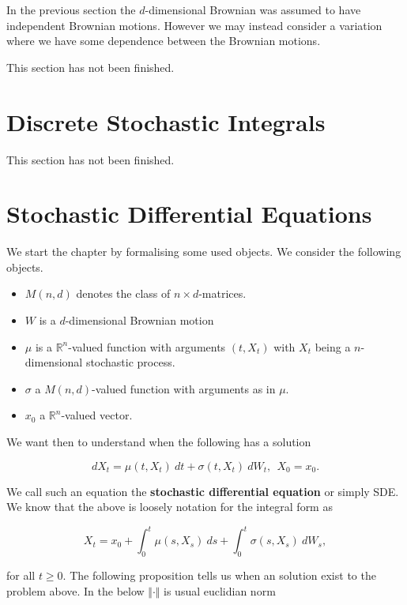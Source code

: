 \documentclass[a4paper,12pt,openany]{book}
\providecommand{\tightlist}{%
 \setlength{\itemsep}{0pt}\setlength{\parskip}{0pt}}
\begin{document}
In the previous section the \(d\)-dimensional Brownian was assumed to have independent Brownian motions. However we may instead consider a variation where we have some dependence between the Brownian motions.

This section has not been finished.

\hypertarget{discrete-stochastic-integrals}{%
\section{Discrete Stochastic Integrals}\label{discrete-stochastic-integrals}}

This section has not been finished.

\hypertarget{stochastic-differential-equations}{%
\section{Stochastic Differential Equations}\label{stochastic-differential-equations}}

We start the chapter by formalising some used objects. We consider the following objects.

\begin{itemize}
\tightlist
\item
  \(M(n,d)\) denotes the class of \(n\times d\)-matrices.
\item
  \(W\) is a \(d\)-dimensional Brownian motion
\item
  \(\mu\) is a \(\mathbb{R}^n\)-valued function with arguments \((t,X_t)\) with \(X_t\) being a \(n\)-dimensional stochastic process.
\item
  \(\sigma\) a \(M(n,d)\)-valued function with arguments as in \(\mu\).
\item
  \(x_0\) a \(\mathbb{R}^n\)-valued vector.
\end{itemize}

We want then to understand when the following has a solution

\[
dX_t=\mu(t,X_t)\ dt + \sigma(t,X_t)\ dW_t,\ \ X_0=x_0.\tag{5.1/2}
\]

We call such an equation the \textbf{stochastic differential equation} or simply SDE. We know that the above is loosely notation for the integral form as

\[
X_t=x_0+\int_0^t\mu(s,X_s)\ ds +\int_0^t\sigma(s,X_s)\ dW_s,\tag{5.3}
\]

for all \(t\ge 0\). The following proposition tells us when an solution exist to the problem above. In the below \(\Vert \cdot \Vert\) is usual euclidian norm
\end{document}
